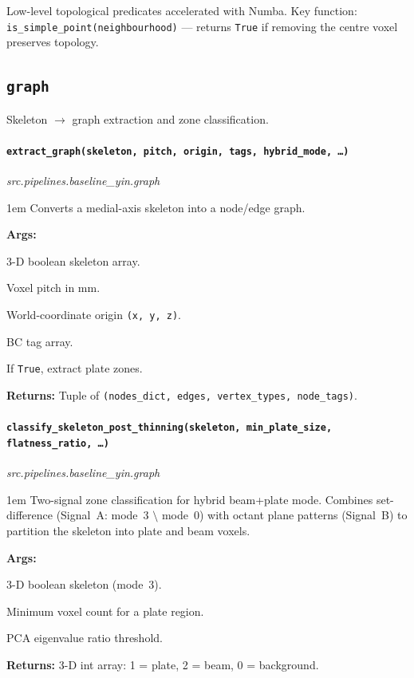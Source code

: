 \documentclass[a4paper, 11pt, openany]{report}
\newcommand{\apifunc}[2]{%
    \paragraph{\texttt{#2}}\hfill\textit{\small #1}\par\nopagebreak
}
\begin{document}
Low-level topological predicates accelerated with Numba.  Key function:
\texttt{is\_simple\_point(neighbourhood)} --- returns \texttt{True} if removing
the centre voxel preserves topology.


\subsection{\texttt{graph}}

Skeleton $\to$ graph extraction and zone classification.

\apifunc{src.pipelines.baseline\_yin.graph}{extract\_graph(skeleton, pitch, origin, tags, hybrid\_mode, \ldots)}

\begin{adjustwidth}{1em}{}
Converts a medial-axis skeleton into a node/edge graph.

\textbf{Args:}
\begin{description}[nosep, labelwidth=3cm, leftmargin=3.5cm]
    \item[\texttt{skeleton}] 3-D boolean skeleton array.
    \item[\texttt{pitch}] Voxel pitch in mm.
    \item[\texttt{origin}] World-coordinate origin \texttt{(x, y, z)}.
    \item[\texttt{tags}] BC tag array.
    \item[\texttt{hybrid\_mode}] If \texttt{True}, extract plate zones.
\end{description}

\textbf{Returns:} Tuple of \texttt{(nodes\_dict, edges, vertex\_types, node\_tags)}.
\end{adjustwidth}

\apifunc{src.pipelines.baseline\_yin.graph}{classify\_skeleton\_post\_thinning(skeleton, min\_plate\_size, flatness\_ratio, \ldots)}

\begin{adjustwidth}{1em}{}
Two-signal zone classification for hybrid beam+plate mode.  Combines
set-difference (Signal~A: mode~3 $\setminus$ mode~0) with octant plane
patterns (Signal~B) to partition the skeleton into plate and beam voxels.

\textbf{Args:}
\begin{description}[nosep, labelwidth=3cm, leftmargin=3.5cm]
    \item[\texttt{skeleton}] 3-D boolean skeleton (mode~3).
    \item[\texttt{min\_plate\_size}] Minimum voxel count for a plate region.
    \item[\texttt{flatness\_ratio}] PCA eigenvalue ratio threshold.
\end{description}

\textbf{Returns:} 3-D int array: 1 = plate, 2 = beam, 0 = background.
\end{adjustwidth}
\end{document}
